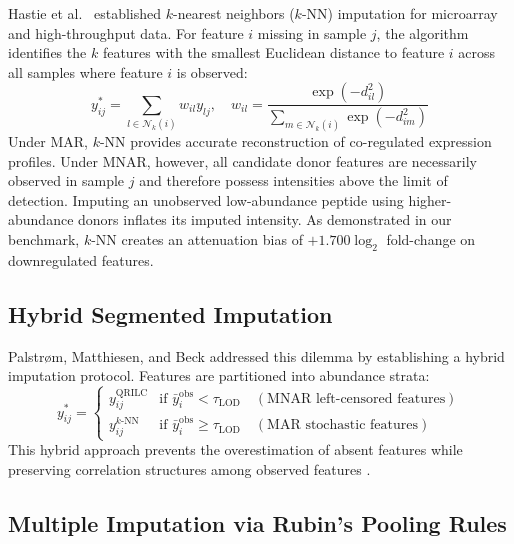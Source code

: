 \documentclass[11pt,oneside]{book}
\begin{document}
Hastie et al.~\cite{hastie2001impute} established $k$-nearest neighbors ($k$-NN) imputation for microarray and high-throughput data. For feature $i$ missing in sample $j$, the algorithm identifies the $k$ features with the smallest Euclidean distance to feature $i$ across all samples where feature $i$ is observed:
\begin{equation}
y_{ij}^* = \sum_{l \in \mathcal{N}_k(i)} w_{il} y_{lj}, \quad w_{il} = \frac{\exp(-d_{il}^2)}{\sum_{m \in \mathcal{N}_k(i)} \exp(-d_{im}^2)}
\end{equation}
Under MAR, $k$-NN provides accurate reconstruction of co-regulated expression profiles. Under MNAR, however, all candidate donor features are necessarily observed in sample $j$ and therefore possess intensities above the limit of detection. Imputing an unobserved low-abundance peptide using higher-abundance donors inflates its imputed intensity. As demonstrated in our benchmark, $k$-NN creates an attenuation bias of $+1.700 \log_2$ fold-change on downregulated features.

\subsection{Hybrid Segmented Imputation}

Palstr\o m, Matthiesen, and Beck \cite{palstrom2020imputation} addressed this dilemma by establishing a hybrid imputation protocol. Features are partitioned into abundance strata:
\begin{equation}
y_{ij}^* = \begin{cases}
y_{ij}^{\text{QRILC}} & \text{if } \bar{y}_i^{\text{obs}} < \tau_{\text{LOD}} \quad (\text{MNAR left-censored features}) \\
y_{ij}^{k\text{-NN}} & \text{if } \bar{y}_i^{\text{obs}} \ge \tau_{\text{LOD}} \quad (\text{MAR stochastic features})
\end{cases}
\end{equation}
This hybrid approach prevents the overestimation of absent features while preserving correlation structures among observed features \cite{palstrom2020imputation}.

\subsection{Multiple Imputation via Rubin's Pooling Rules}
\end{document}

